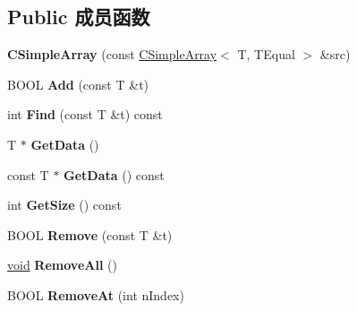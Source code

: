 \subsection*{Public 成员函数}
\begin{DoxyCompactItemize}
\item 
\mbox{\label{class_a_t_l_1_1_c_simple_array_a156a675b4c35dc0511abce4fdc4c2721}} 
{\bfseries C\+Simple\+Array} (const \hyperlink{class_a_t_l_1_1_c_simple_array}{C\+Simple\+Array}$<$ T, T\+Equal $>$ \&src)
\item 
\mbox{\label{class_a_t_l_1_1_c_simple_array_a6ab4dd5c45f4819f81806cd5b13d8cef}} 
B\+O\+OL {\bfseries Add} (const T \&t)
\item 
\mbox{\label{class_a_t_l_1_1_c_simple_array_a7bdb03d6798dace2c084c636e6e1064c}} 
int {\bfseries Find} (const T \&t) const
\item 
\mbox{\label{class_a_t_l_1_1_c_simple_array_aea2fa0f6c8bac0237e1f82708f839906}} 
T $\ast$ {\bfseries Get\+Data} ()
\item 
\mbox{\label{class_a_t_l_1_1_c_simple_array_a9dc46f5b60127253e7872373cce496c3}} 
const T $\ast$ {\bfseries Get\+Data} () const
\item 
\mbox{\label{class_a_t_l_1_1_c_simple_array_a17855ab04e8a606e917c240a77059214}} 
int {\bfseries Get\+Size} () const
\item 
\mbox{\label{class_a_t_l_1_1_c_simple_array_a008fbf66799a92711be39901e73adc15}} 
B\+O\+OL {\bfseries Remove} (const T \&t)
\item 
\mbox{\label{class_a_t_l_1_1_c_simple_array_a2a4323079749d7ef7ea947746b0599c8}} 
\hyperlink{interfacevoid}{void} {\bfseries Remove\+All} ()
\item 
\mbox{\label{class_a_t_l_1_1_c_simple_array_a35261babab68a52543f8a61a3cee6f38}} 
B\+O\+OL {\bfseries Remove\+At} (int n\+Index)
\item 

\end{DoxyCompactItemize}
